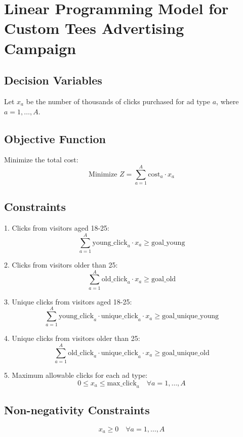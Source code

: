 \documentclass{article}
\begin{document}
\section*{Linear Programming Model for Custom Tees Advertising Campaign}

\subsection*{Decision Variables}
Let \( x_a \) be the number of thousands of clicks purchased for ad type \( a \), where \( a = 1, \ldots, A \).

\subsection*{Objective Function}
Minimize the total cost:
\[
\text{Minimize } Z = \sum_{a=1}^{A} \text{cost}_a \cdot x_a
\]

\subsection*{Constraints}

1. Clicks from visitors aged 18-25:
\[
\sum_{a=1}^{A} \text{young\_click}_a \cdot x_a \geq \text{goal\_young}
\]

2. Clicks from visitors older than 25:
\[
\sum_{a=1}^{A} \text{old\_click}_a \cdot x_a \geq \text{goal\_old}
\]

3. Unique clicks from visitors aged 18-25:
\[
\sum_{a=1}^{A} \text{young\_click}_a \cdot \text{unique\_click}_a \cdot x_a \geq \text{goal\_unique\_young}
\]

4. Unique clicks from visitors older than 25:
\[
\sum_{a=1}^{A} \text{old\_click}_a \cdot \text{unique\_click}_a \cdot x_a \geq \text{goal\_unique\_old}
\]

5. Maximum allowable clicks for each ad type:
\[
0 \leq x_a \leq \text{max\_click}_a \quad \forall a = 1, \ldots, A
\]

\subsection*{Non-negativity Constraints}
\[
x_a \geq 0 \quad \forall a = 1, \ldots, A
\]
\end{document}
